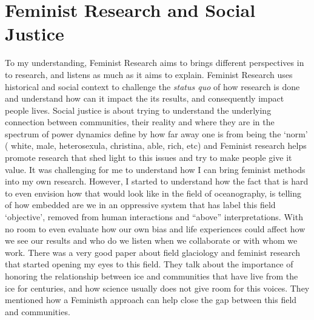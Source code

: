 \documentclass{tufte-handout}
\begin{document}






\section{Feminist Research and Social Justice}\label{sec:installation}

To my understanding, Feminist Research aims to brings different perspectives in to research, and listens as much as it aims to explain. Feminist Research uses historical and social context to challenge the \textit{status quo} of how research is done and understand how can it impact the its results, and consequently impact people lives. Social justice is about trying to understand the underlying connection between communities, their reality and where they are in the spectrum of power dynamics define by how far away one is from being the `norm' ( white, male, heterosexula, christina, able, rich, etc) and Feminist research helps promote research that shed light to this issues and try to make people give it value. It was challenging for me to understand how I can bring feminist methods into my own research. However, I started to understand how the fact that is hard to even envision how that would look like in the field of oceanography, is telling of how embedded are we in an oppressive system that has label this field `objective', removed from human interactions and “above” interpretations. With no room to even evaluate how our own bias and life experiences could affect how we see our results and who do we listen when we collaborate or with whom we work.  There was a very good paper about field glaciology\cite{Carey2016GlaciersScience} and feminist research that started opening my eyes to this field. They talk about the importance of honoring the relationship between ice and communities that have live from the ice for centuries, and how science usually does not give room for this voices. They mentioned how a Feministh approach can help close the gap between this field and communities. 	 


\end{document}
